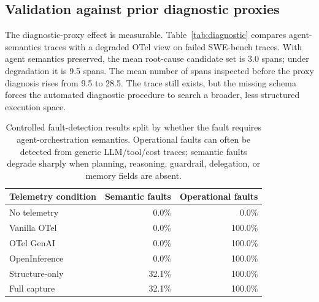\documentclass[conference]{IEEEtran}
\begin{document}
\subsection{Validation against prior diagnostic proxies}

The diagnostic-proxy effect is measurable. Table~\ref{tab:diagnostic}
compares agent-semantics traces with a degraded OTel view on failed
SWE-bench traces. With agent semantics preserved, the mean root-cause
candidate set is 3.0 spans; under degradation it is 9.5 spans. The mean
number of spans inspected before the proxy diagnosis rises from 9.5 to
28.5. The trace still exists, but the missing schema forces the
automated diagnostic procedure to search a broader, less structured
execution space.

\begin{table}[t]
\centering
\caption{Downstream diagnostic degradation when agent-specific trace data
are removed. Lower is better for candidate spans and
spans-to-diagnosis; higher is better for signal-to-noise.}
\label{tab:diagnostic}
\end{table}

\begin{table}[t]
\centering
\scriptsize
\caption{Controlled fault-detection results split by whether the fault
requires agent-orchestration semantics. Operational faults can often be
detected from generic LLM/tool/cost traces; semantic faults degrade
sharply when planning, reasoning, guardrail, delegation, or memory
fields are absent.}
\label{tab:faultfamilies}
\begin{tabular}{@{}lrr@{}}
\toprule
Telemetry condition & Semantic faults & Operational faults \\
\midrule
No telemetry & 0.0\% & 0.0\% \\
Vanilla OTel & 0.0\% & 100.0\% \\
OTel GenAI & 0.0\% & 100.0\% \\
OpenInference & 0.0\% & 100.0\% \\
Structure-only & 32.1\% & 100.0\% \\
Full capture & 32.1\% & 100.0\% \\
\bottomrule
\end{tabular}
\end{table}
\end{document}
